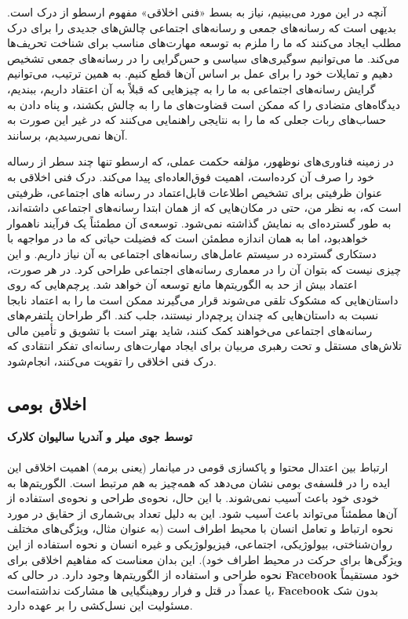 آنچه در این مورد می‌بینیم، نیاز به بسط «فنی اخلاقی» مفهوم ارسطو از درک است.
بدیهی است که رسانه‌های جمعی و رسانه‌های اجتماعی چالش‌های جدیدی را برای درک مطلب ایجاد می‌کنند که ما را ملزم به توسعه مهارت‌های مناسب برای شناخت تحریف‌ها می‌کند.
ما می‌توانیم سوگیری‌های سیاسی و حس‌گرایی را در رسانه‌های جمعی تشخیص دهیم و تمایلات خود را برای عمل بر اساس آن‌ها قطع کنیم.
به همین ترتیب، می‌توانیم گرایش رسانه‌های اجتماعی به ما را به چیزهایی که قبلاً به آن اعتقاد داریم، ببندیم، دیدگاه‌های متضادی را که ممکن است قضاوت‌های ما را به چالش بکشند، و پناه دادن به حساب‌های ربات جعلی که ما را به نتایجی راهنمایی می‌کنند که در غیر این صورت به آن‌ها نمی‌رسیدیم، برسانند.

در زمینه فناوری‌های نوظهور، مؤلفه حکمت عملی، که ارسطو تنها چند سطر از رساله خود را صرف آن کرده‌است، اهمیت فوق‌العاده‌ای پیدا می‌کند.
درک فنی اخلاقی به عنوان ظرفیتی برای تشخیص اطلاعات قابل‌اعتماد در رسانه های اجتماعی، ظرفیتی است که، به نظر من، حتی در مکان‌هایی که از همان ابتدا رسانه‌های اجتماعی داشته‌اند، به طور گسترده‌ای به نمایش گذاشته نمی‌شود.
توسعه‌ی آن مطمئناً یک فرآیند ناهموار خواهد‌بود، اما به همان اندازه مطمئن است که فضیلت حیاتی که ما در مواجهه با دستکاری گسترده در سیستم عامل‌های رسانه‌های اجتماعی به آن نیاز داریم.
و این چیزی نیست که بتوان آن را در معماری رسانه‌های اجتماعی طراحی کرد.
در هر صورت، اعتماد بیش از حد به الگوریتم‌ها مانع توسعه آن خواهد شد.
پرچم‌هایی که روی داستان‌هایی که مشکوک تلقی می‌شوند قرار می‌گیرند ممکن است ما را به اعتماد نابجا نسبت به داستان‌هایی که چندان پرچم‌دار نیستند، جلب کند.
اگر طراحان پلتفرم‌های رسانه‌های اجتماعی می‌خواهند کمک کنند، شاید بهتر است با تشویق و تأمین مالی تلاش‌های مستقل و تحت رهبری مربیان برای ایجاد مهارت‌های رسانه‌ای تفکر انتقادی که درک فنی اخلاقی را تقویت می‌کنند، انجام‌شود.



{
\subsection*{اخلاق بومی}
\label{subsec:اخلاق بومی}
\noindent \textbf{توسط جوی میلر و آندریا سالیوان کلارک}
\\\\
ارتباط بین اعتدال محتوا و پاکسازی قومی در میانمار (یعنی برمه) اهمیت اخلاقی این ایده را در فلسفه‌ی بومی نشان می‌دهد که همه‌چیز به هم مرتبط است.
الگوریتم‌ها به خودی خود باعث آسیب نمی‌شوند.
با این حال، نحوه‌ی طراحی و نحوه‌ی استفاده از آن‌ها مطمئناً می‌تواند باعث آسیب شود.
این به دلیل تعداد بی‌شماری از حقایق در مورد نحوه ارتباط و تعامل انسان با محیط اطراف است (به عنوان مثال، ویژگی‌های مختلف روان‌شناختی، بیولوژیکی، اجتماعی، فیزیولوژیکی و غیره انسان و نحوه استفاده از این ویژگی‌ها برای حرکت در محیط اطراف خود).
این بدان معناست که مفاهیم اخلاقی برای نحوه طراحی و استفاده از الگوریتم‌ها وجود دارد.
در حالی که \textenglish{\textbf{Facebook}} خود مستقیماً یا عمداً در قتل و فرار روهینگیایی ها مشارکت نداشته‌است، \textenglish{\textbf{Facebook}} بدون شک مسئولیت این نسل‌کشی را بر عهده دارد.
}

